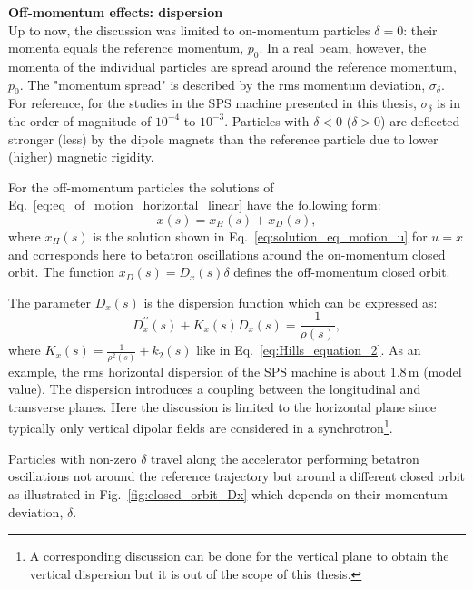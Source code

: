 \textbf{Off-momentum effects: dispersion}\\
Up to now, the discussion was limited to on-momentum particles $\delta=0$: their momenta equals the reference momentum, $p_0$. In a real beam, however, the momenta of the individual particles are spread around the reference momentum, $p_0$. The "momentum spread" is described by the rms momentum deviation, $\sigma_\delta$. For reference, for the studies in the SPS machine presented in this thesis, $\sigma_\delta$ is in the order of magnitude of $10^{-4}$ to $10^{-3}$. Particles with $\delta < 0$ ($\delta>0$) are deflected stronger (less) by the dipole magnets than the reference particle due to lower (higher) magnetic rigidity.

For the off-momentum particles the solutions of Eq.~\eqref{eq:eq_of_motion_horizontal_linear} have the following form:
\begin{equation}
    x(s) = x_H(s) + x_D(s),
\end{equation}
where $x_H(s)$ is the solution shown in Eq.~\eqref{eq:solution_eq_motion_u} for $u=x$ and corresponds here to betatron oscillations around the on-momentum closed orbit. %
The function $x_D(s)=D_x(s) \delta$ defines the off-momentum closed orbit. 

The parameter $D_x(s)$ is the dispersion function which can be expressed as:
\begin{equation}\label{eq:dispersion_function}
    D^{\prime \prime}_x(s) + K_x(s)D_x(s) = \frac{1}{\rho(s)},
\end{equation}
where $K_x(s)= \frac{1}{\rho^2(s)}+k_2(s)$ like in Eq.~\eqref{eq:Hills_equation_2}. As an example, the rms horizontal dispersion of the SPS machine is about 1.8\,m (model value). The dispersion introduces a coupling between the longitudinal and transverse planes. Here the discussion is limited to the horizontal plane since typically only vertical dipolar fields are considered in a synchrotron\footnote{A corresponding discussion can be done for the vertical plane to obtain the vertical dispersion but it is out of the scope of this thesis.}.

Particles with non-zero $\delta$ travel along the accelerator performing betatron oscillations not around the reference trajectory but around a different closed orbit as illustrated in Fig.~\ref{fig:closed_orbit_Dx} which depends on their momentum deviation, $\delta$. 



